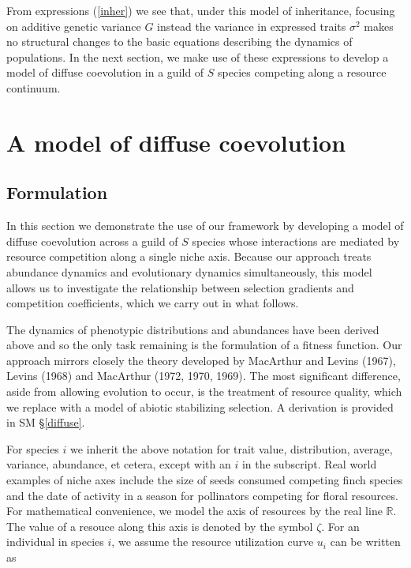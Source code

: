 \documentclass[]{elsarticle} %
\begin{document}
From expressions (\ref{inher}) we see that, under this model of
inheritance, focusing on additive genetic variance \(G\) instead the
variance in expressed traits \(\sigma^2\) makes no structural changes to
the basic equations describing the dynamics of populations. In the next
section, we make use of these expressions to develop a model of diffuse
coevolution in a guild of \(S\) species competing along a resource
continuum.

\hypertarget{a-model-of-diffuse-coevolution}{%
\section{\texorpdfstring{A model of diffuse coevolution
\label{coev}}{A model of diffuse coevolution }}\label{a-model-of-diffuse-coevolution}}

\hypertarget{formulation}{%
\subsection{\texorpdfstring{Formulation
\label{form_coev}}{Formulation }}\label{formulation}}

In this section we demonstrate the use of our framework by developing a
model of diffuse coevolution across a guild of \(S\) species whose
interactions are mediated by resource competition along a single niche
axis. Because our approach treats abundance dynamics and evolutionary
dynamics simultaneously, this model allows us to investigate the
relationship between selection gradients and competition coefficients,
which we carry out in what follows.

The dynamics of phenotypic distributions and abundances have been
derived above and so the only task remaining is the formulation of a
fitness function. Our approach mirrors closely the theory developed by
MacArthur and Levins (1967), Levins (1968) and MacArthur (1972, 1970,
1969). The most significant difference, aside from allowing evolution to
occur, is the treatment of resource quality, which we replace with a
model of abiotic stabilizing selection. A derivation is provided in SM
\S\ref{diffuse}.

For species \(i\) we inherit the above notation for trait value,
distribution, average, variance, abundance, et cetera, except with an
\(i\) in the subscript. Real world examples of niche axes include the
size of seeds consumed competing finch species and the date of activity
in a season for pollinators competing for floral resources. For
mathematical convenience, we model the axis of resources by the real
line \(\mathbb{R}\). The value of a resouce along this axis is denoted
by the symbol \(\zeta\). For an individual in species \(i\), we assume
the resource utilization curve \(u_i\) can be written as
\end{document}
